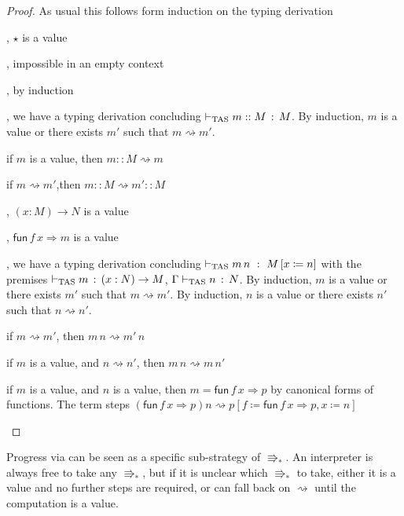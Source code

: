 \begin{proof}
As usual this follows form induction on the typing derivation
 
\begin{casenv}
 \item {}, $\star$ is a value
 \item {}, impossible in an empty context
 \item {}, by induction
 \item {}, we have a typing derivation concluding $\vdash_{\mathrm{TAS}} m::M\,:\,M$.
 By induction, $m$ is a value or there exists $m'$ such that $m\rightsquigarrow m'$.
 \begin{casenv}
   \item if $m$ is a value, then $m::M\rightsquigarrow m$
   \item if $m\rightsquigarrow m'$,then $m::M\rightsquigarrow m'::M$
 \end{casenv}
 \item {}, $\left(x:M\right)\rightarrow N$ is a value
 \item {}, $\mathsf{fun}\,f\,x\Rightarrow m$ is a value
 \item {}, we have a typing derivation concluding $\vdash_{\mathrm{TAS}} m\,n\ :\ M\left[x\coloneqq n\right]$ with the premises $\vdash_{\mathrm{TAS}} m\,:\,\left(x:N\right)\rightarrow M$, $\Gamma\vdash_{\mathrm{TAS}} n\,:\,N$.
 By induction, $m$ is a value or there exists $m'$ such that $m\rightsquigarrow m'$.
 By induction, $n$ is a value or there exists $n'$ such that $n\rightsquigarrow n'$.
 \begin{casenv}
   \item if $m\rightsquigarrow m'$, then $m\,n\rightsquigarrow m'\,n$
   \item if $m$ is a value, and $n\rightsquigarrow n'$,  then $m\,n\rightsquigarrow m\,n'$
   \item if $m$ is a value, and $n$ is a value, then $m=\mathsf{fun}\,f\,x\Rightarrow p$ by canonical forms of functions.
     The term steps $\left(\mathsf{fun}\,f\,x\Rightarrow p\right)n\rightsquigarrow p\left[f\coloneqq\mathsf{fun}\,f\,x\Rightarrow p,x\coloneqq n\right]$
 \end{casenv}
\end{casenv}
 
\end{proof}
Progress via \cbv{} can be seen as a specific sub-strategy of $\Rrightarrow_*$.
An interpreter is always free to take any $\Rrightarrow_*$, but if it is unclear which $\Rrightarrow_*$ to take, either it is a value and no further steps are required, or can fall back on $\rightsquigarrow$ until the computation is a value.

